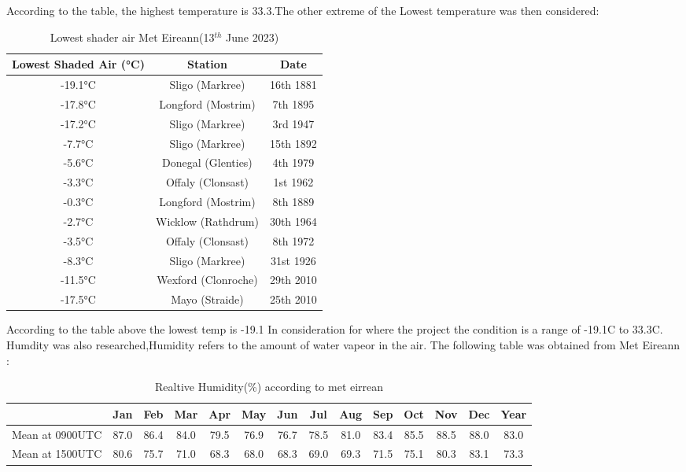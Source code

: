 According to the table, the highest temperature is 33.3.The  other  extreme of the Lowest temperature was then considered:
	\begin{table}[h!]
		\begin{tabular}{ | c | c | c | }
		\hline
		Lowest Shaded Air (°C) & Station & Date \\ \hline
		-19.1°C & Sligo (Markree) & 16th 1881 \\ \hline
		-17.8°C & Longford (Mostrim) & 7th 1895 \\ \hline
		-17.2°C & Sligo (Markree) & 3rd 1947 \\ \hline
		-7.7°C & Sligo (Markree) & 15th 1892 \\ \hline
		-5.6°C & Donegal (Glenties) & 4th 1979 \\ \hline
		-3.3°C & Offaly (Clonsast) & 1st 1962 \\ \hline
		-0.3°C & Longford (Mostrim) & 8th 1889 \\ \hline
		-2.7°C & Wicklow (Rathdrum) & 30th 1964 \\ \hline
		-3.5°C & Offaly (Clonsast) & 8th 1972 \\ \hline
		-8.3°C & Sligo (Markree) & 31st 1926 \\ \hline
		-11.5°C & Wexford (Clonroche) & 29th 2010 \\ \hline
		-17.5°C & Mayo (Straide) & 25th 2010 \\ \hline
		\end{tabular}
	\caption{Lowest shader air Met Eireann(13$^{th}$ June 2023)}
	\label{Lowest shader air Met eirrean}	
	\end{table}

According to the table above the lowest temp is -19.1
In consideration for where the project the condition is a range of -19.1\textdegree C to 33.3\textdegree C.
\newpage
Humdity was also researched,Humidity refers to the amount of water vapeor in the air. The following table was obtained from Met Eireann \cite{eirrean2}:
\begin{table}[h!]
	\begin{tabular}{|c|c|c|c|c|c|c|c|c|c|c|c|c|c|}
		\hline
		\space & Jan & Feb & Mar & Apr & May & Jun & Jul & Aug & Sep & Oct & Nov & Dec & Year \\
		\hline
		Mean at 0900UTC &87.0 &86.4&84.0&79.5&76.9&76.7&78.5&81.0&83.4&85.5&88.5&88.0&83.0 \\
		Mean at 1500UTC &80.6&75.7&71.0&68.3&68.0&68.3&69.0&69.3&71.5&75.1&80.3&83.1&73.3\\
		\hline
	\end{tabular}
	\caption{Realtive Humidity(\%) according to met eirrean}
	\label{Realtive Humidity according to met eirrean}
\end{table}

